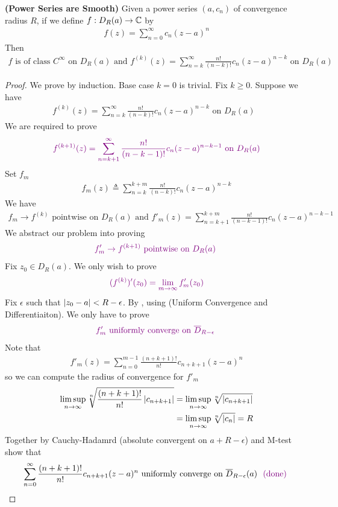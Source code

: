 \documentclass{report}
\begin{document}
\begin{theorem}
\textbf{(Power Series are Smooth)} Given a power series $(a,c_n)$ of convergence radius $R$, if we define $f:D_R(a)\rightarrow \mathbb{C}$ by 
\begin{align*}
f(z)=\sum_{n=0}^\infty c_n (z-a)^n 
\end{align*}
Then 
\begin{align*}
f\text{ is of class }C^\infty\text{ on $D_{R}(a)$ and $f^{(k)}(z)=\sum_{n=k}^\infty \frac{n!}{(n-k)!}c_n(z-a)^{n-k}$  on $D_R(a)$}
\end{align*}
\end{theorem}
\begin{proof}
We prove by induction. Base case $k=0$ is trivial. Fix $k\geq 0$. Suppose we have 
\begin{align*}
f^{(k)}(z)=\sum_{n=k}^{\infty} \frac{n!}{(n-k)!}c_n(z-a)^{n-k}\text{ on $D_R(a)$ }
\end{align*}
We are required to prove 
\begin{align*}
\textcolor{violet}{f^{(k+1)}(z)=\sum_{n=k+1}^\infty \frac{n!}{(n-k-1)!}c_n(z-a)^{n-k-1}\text{ on }D_R(a)}
\end{align*} 
Set $f_m$ 
 \begin{align*}
f_m(z)\triangleq \sum_{n=k}^{k+m} \frac{n!}{(n-k)!}c_n(z-a)^{n-k}
\end{align*}
We have 
\begin{align}
\label{PS1}
f_m \to f^{(k)}\text{ pointwise on $D_R(a)$ and }f'_m (z)= \sum_{n=k+1}^{k+m}\frac{n!}{(n-k-1)!}c_n(z-a)^{n-k-1}
\end{align}
We abstract our problem into proving 
\begin{align*}
  \textcolor{violet}{f'_m \to f^{(k+1)}\text{ pointwise on $D_R(a)$ }}
\end{align*}
Fix $z_0 \in D_R(a)$. We only wish to prove 
\begin{align*}
\textcolor{violet}{(f^{(k)})'(z_0)=\lim_{m\to \infty}f'_m(z_0)}
\end{align*}
Fix $\epsilon $ such that $\left|z_0-a\right|< R-\epsilon $. By , using  (Uniform Convergence and Differentiaiton). We only have to prove 
\begin{align*}
  \textcolor{violet}{f'_m\text{ uniformly converge on $\overline{D}_{R-\epsilon }$ }}
\end{align*}
Note that 
\begin{align*}
f'_m(z)=\sum_{n=0}^{m-1} \frac{(n+k+1)!}{n!}c_{n+k+1}(z-a)^n
\end{align*}
so we can compute the radius of convergence for $f'_m$
\begin{align*}
\limsup_{n\to\infty} \sqrt[n]{\frac{(n+k+1)!}{n!}\left|c_{n+k+1}\right|}&=\limsup_{n\to\infty} \sqrt[n]{\left|c_{n+k+1}\right|} \\
&=\limsup_{n\to\infty} \sqrt[n]{\left|c_n\right|}=R 
\end{align*}
Together by Cauchy-Hadamrd (absolute convergent on $a+R-\epsilon $) and M-test show that 
\begin{align*}
\sum_{n=0}^\infty \frac{(n+k+1)!}{n!}c_{n+k+1}(z-a)^n \text{ uniformly converge on $\overline{D}_{R-\epsilon }(a)$ }\textcolor{violet}{\text{ (done) }}
\end{align*}
\end{proof}
\end{document}
